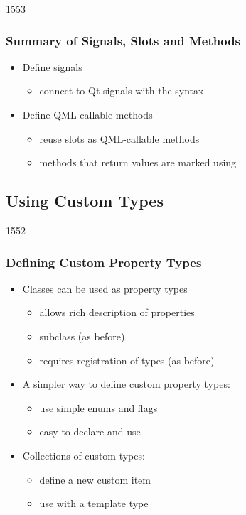 \begin{slide}{1553}\frametitle{Summary of Signals, Slots and Methods}

\begin{itemize}
\item Define signals
  \begin{itemize}
  \item connect to Qt signals with the  syntax
  \end{itemize}
\item Define QML-callable methods
  \begin{itemize}
  \item reuse slots as QML-callable methods
  \item methods that return values are marked using 
  \end{itemize}
\end{itemize}

\end{slide}
                             

\subsection{Using Custom Types}

\begin{slide}{1552}\frametitle{Defining Custom Property Types}

\begin{itemize}
\item Classes can be used as property types
  \begin{itemize}
  \item allows rich description of properties
  \item subclass  (as before)
  \item requires registration of types (as before)
  \end{itemize}

\vspace*{0.5em}
\item A simpler way to define custom property types:
  \begin{itemize}
  \item use simple enums and flags
  \item easy to declare and use
  \end{itemize}

\vspace*{0.5em}
\item Collections of custom types:
  \begin{itemize}
  \item define a new custom item
  \item use with a  template type
  \end{itemize}
\end{itemize}

\end{slide}

